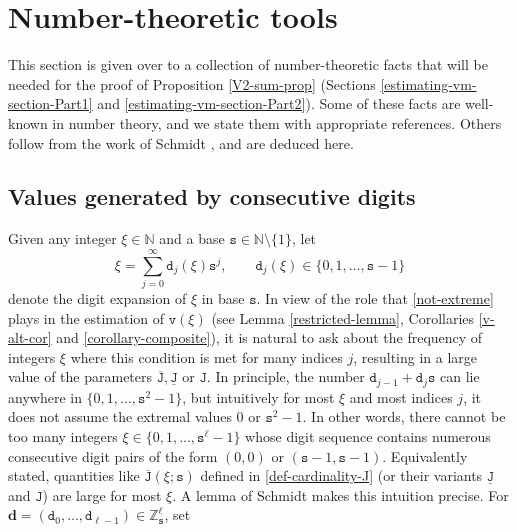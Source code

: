 \documentclass[12pt, twoside]{article}
\def\red{\color{red}}
\theoremstyle{definition}
\numberwithin{equation}{section}
\begin{document}
\section{Number-theoretic tools} \label{number-theoretic-tools-section} 
 This section is given over to a collection of number-theoretic facts that will be needed for the proof of Proposition \ref{V2-sum-prop} (Sections \ref{estimating-vm-section-Part1} and \ref{estimating-vm-section-Part2}). Some of these facts are well-known in number theory, and we state them with appropriate references. Others follow from the work of Schmidt \cite{s60}, and are deduced here. 
\subsection{Values generated by consecutive digits} \label{consecutive-digits-section}
Given any integer $\xi \in \mathbb N$ and a base $\mathtt s \in \mathbb N \setminus \{1\}$, let 
\begin{equation*} 
\xi = \sum_{j=0}^{\infty} \mathtt d_j(\xi) {\mathtt s}^j, \qquad \mathtt d_j(\xi) \in \{0, 1, \ldots, \mathtt s-1\} 
\end{equation*} 
denote the digit expansion of $\xi$ in base $\mathtt s$. In view of the role that \eqref{not-extreme} plays in the estimation of $\mathtt v(\xi)$ (see Lemma \ref{restricted-lemma}, Corollaries \ref{v-alt-cor} and \ref{corollary-composite}), it is natural to ask about the frequency of integers $\xi$ where this condition is met for many indices $j$, resulting in a large value of the parameters $\overline{\mathtt J}, \underline{\mathtt J}$ or $\mathtt J$. 
In principle, the number $\mathtt d_{j-1} + \mathtt d_j \mathtt s$ can lie anywhere in $\{0, 1, \ldots, \mathtt s^2-1\}$, but intuitively for most $\xi$ and most indices $j$, it does not assume the extremal values $0$ or $\mathtt s^2-1$. In other words, there cannot be too many integers $\xi \in \{0, 1, \ldots, \mathtt s^{\ell}-1\}$ whose digit sequence contains numerous consecutive digit pairs of the form $(0, 0)$ or $(\mathtt s-1, \mathtt s-1)$. Equivalently stated, quantities like $\overline{\mathtt J}(\xi; \mathtt s)$ defined in \eqref{def-cardinality-J} (or their variants $\underline{\mathtt J}$ and $\mathtt J$) are large for most $\xi$. A lemma of Schmidt \cite{s60} makes this intuition precise. For $\mathbf d = (\mathtt d_0, \ldots, \mathtt d_{\ell-1}) \in \mathbb Z_{\mathtt s}^{\ell}$, set 
\end{document}
